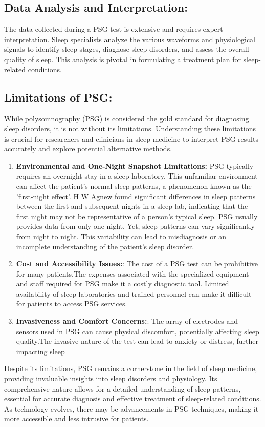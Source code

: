 \documentclass[12pt, a4paper,oneside]{book}
\numberwithin{equation}{section}
\begin{document}
\subsection{Data Analysis and Interpretation:}\label{2.3.3}
The data collected during a PSG test is extensive and requires expert interpretation. Sleep specialists analyze the various waveforms and physiological signals to identify sleep stages, diagnose sleep disorders, and assess the overall quality of sleep. This analysis is pivotal in formulating a treatment plan for sleep-related conditions.
\subsection{Limitations of PSG:}\label{2.3.4}
While polysomnography (PSG) is considered the gold standard for diagnosing sleep disorders, it is not without its limitations. Understanding these limitations is crucial for researchers and clinicians in sleep medicine to interpret PSG results accurately and explore potential alternative methods.
\begin{enumerate}
    \item  \textbf{Environmental and One-Night Snapshot Limitations:} PSG typically requires an overnight stay in a sleep laboratory. This unfamiliar environment can affect the patient's normal sleep patterns, a phenomenon known as the 'first-night effect'. H W Agnew  found significant differences in sleep patterns between the first and subsequent nights in a sleep lab, indicating that the first night may not be representative of a person's typical sleep.\cite{Agnew1966}
    PSG usually provides data from only one night. Yet, sleep patterns can vary significantly from night to night. This variability can lead to misdiagnosis or an incomplete understanding of the patient's sleep disorder.

    \item \textbf{Cost and Accessibility Issues:}: The cost of a PSG test can be prohibitive for many patients.The expenses associated with the specialized equipment and staff required for PSG make it a costly diagnostic tool.
    Limited availability of sleep laboratories and trained personnel can make it difficult for patients to access PSG services.

    \item  \textbf{Invasiveness and Comfort Concerns:}: The array of electrodes and sensors used in PSG can cause physical discomfort, potentially affecting sleep quality.The invasive nature of the test can lead to anxiety or distress, further impacting sleep
\end{enumerate}
Despite its limitations, PSG remains a cornerstone in the field of sleep medicine, providing invaluable insights into sleep disorders and physiology. Its comprehensive nature allows for a detailed understanding of sleep patterns, essential for accurate diagnosis and effective treatment of sleep-related conditions. As technology evolves, there may be advancements in PSG techniques, making it more accessible and less intrusive for patients.
\end{document}
